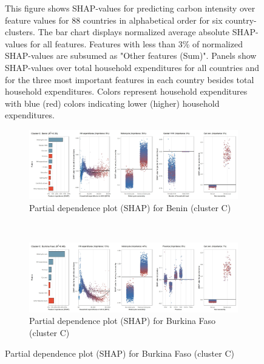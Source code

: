 \begin{figure}[ht!]
    \begin{subcaption2}
     This figure shows SHAP-values for predicting carbon intensity over feature values for 88 countries in alphabetical order for six country-clusters. The bar chart displays normalized average absolute SHAP-values for all features. Features with less than 3\% of normalized SHAP-values are subsumed as "Other features (Sum)". Panels show SHAP-values over total household expenditures for all countries and for the three most important features in each country besides total household expenditures. Colors represent household expenditures with blue (red) colors indicating lower (higher) household expenditures.
     \end{subcaption2}
\end{figure}

\begin{figure}[ht!]\ContinuedFloat
    \centering
   \begin{subfigure}[b]{\textwidth}
   \centering
         \caption{Partial dependence plot (SHAP) for Benin (cluster C)}
         \label{fig:5b_BEN}
         \includegraphics[width=\textwidth]{Figure 5b/Figure_5b_BEN}
         \end{subfigure}
    \\
    \vspace{0.5cm}
    \begin{subfigure}[b]{\textwidth}
   \centering
         \caption{Partial dependence plot (SHAP) for Burkina Faso (cluster C)}
         \label{fig:5b_BFA}
         \includegraphics[width=\textwidth]{Figure 5b/Figure_5b_BFA}  
         \end{subfigure}

\end{figure}
